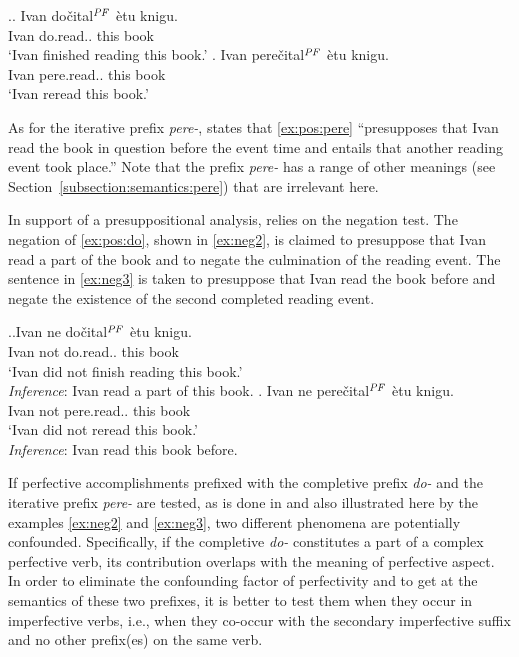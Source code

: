 \ex.\ag. \label{ex:pos:do}Ivan do\v{c}ital$^{\mathit{PF}}$ \`{e}tu knigu.\\
Ivan do.read.. this book\\
\vspace{0.5em}
 `Ivan finished reading this book.'
\bg. \label{ex:pos:pere}Ivan pere\v{c}ital$^{\mathit{PF}}$ \`{e}tu knigu.\\
Ivan pere.read.. this book\\
\vspace{0.5em}
`Ivan reread this book.'

As for the iterative prefix \textit{pere-}, \citet[145]{Kagan:book} states that \ref{ex:pos:pere} ``presupposes that Ivan read the book in question before the event time and entails that another reading event took place.'' Note that the prefix \textit{pere-} has a range of other meanings (see Section~\ref{subsection:semantics:pere}) that are irrelevant here.

In support of a presuppositional analysis, \citet{Kagan:book} relies on the negation test. The negation of \ref{ex:pos:do}, shown in \ref{ex:neg2}, is claimed to presuppose that Ivan read a part of the book and to negate the culmination of the reading event. The sentence in \ref{ex:neg3} is taken to presuppose that Ivan read the book before and negate the existence of the second completed reading event.

\ex.\ag.\label{ex:neg2}Ivan ne do\v{c}ital$^{\mathit{PF}}$ \`{e}tu knigu.\\
Ivan not do.read.. this book\\
\vspace{0.5em}
 `Ivan did not finish reading this book.'\\
\textit{Inference}: Ivan read a part of this book.
\bg. \label{ex:neg3}Ivan ne pere\v{c}ital$^{\mathit{PF}}$ \`{e}tu knigu.\\
Ivan not pere.read.. this book\\
\vspace{0.5em}
 `Ivan did not reread this book.'\\
\textit{Inference}: Ivan read this book before.

If perfective accomplishments prefixed with the completive prefix \textit{do-} and the iterative prefix \textit{pere-} are tested, as is done in \citealt{Kagan:book} and also illustrated here by the examples \ref{ex:neg2} and \ref{ex:neg3}, two different phenomena are potentially confounded. Specifically, if the completive \textit{do-} constitutes a part of a complex perfective verb, its contribution overlaps with the meaning of perfective aspect. In order to eliminate the confounding factor of perfectivity and to get at the semantics of these two prefixes, it is better to test them when they occur in imperfective verbs, i.e., when they co-occur with the secondary imperfective suffix and no other prefix(es) on the same verb.

